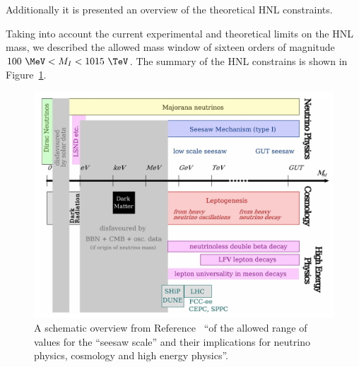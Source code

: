 Additionally it is presented an overview of the theoretical HNL
constraints.

Taking into account 
the current experimental and theoretical limits on the HNL
mass, we described the allowed mass window of sixteen orders of magnitude
$100\ \MeV < M_{I} < 1015\ \TeV$. The summary of the HNL constrains is shown in
Figure~\ref{fig:marcoscheme}. 

\begin{figure}[h!]
  \centering
  \includegraphics[width=.79\textwidth]{Figures/c3/marcoscheme.png}
    \caption{A schematic overview from Reference~\cite{DREWES2017250} ``of the allowed range of values for the “seesaw scale” and their implications for neutrino physics, cosmology and high
energy physics''.~\cite{DREWES2017250}}
  \label{fig:marcoscheme}
\end{figure}










\clearpage

